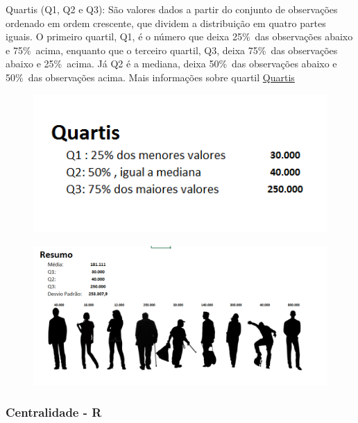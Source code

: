 Quartis (Q1, Q2 e Q3): São valores dados a partir do conjunto de observações ordenado em ordem crescente, que dividem a distribuição em quatro partes iguais. 
O primeiro quartil, Q1, é o número que deixa 25\%\  das observações abaixo e 75\%\ acima, enquanto que o terceiro quartil, Q3, deixa 75\%\ das observações abaixo e 25\%\ acima. Já Q2 é a mediana, deixa 50\%\ das observações abaixo e 50\%\ das observações acima. Mais informações sobre quartil  \href{http://www.portalaction.com.br/estatistica-basica/23-quartis}{Quartis}

	\begin{figure}[h!]
	\includegraphics[scale=0.50]{cap2/MedidasCentralidadeVariabilidade/Quartil.png}
	\end{figure}

	\begin{figure}[h!]	
	\includegraphics[scale=0.35]{cap2/MedidasCentralidadeVariabilidade/Resumo.png}
	\end{figure}

 
\newpage
  
\subsubsection{Centralidade - R}

